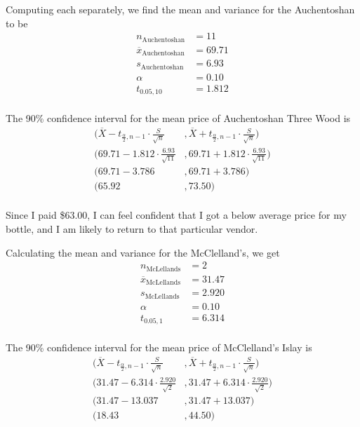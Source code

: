 Computing each separately, we find the mean and variance for the Auchentoshan to be
\begin{equation*}
\begin{split}
    n_{\text{Auchentoshan}} &= 11\\
    \overline{x}_{\text{Auchentoshan}} &= 69.71\\
    s_{\text{Auchentoshan}} &= 6.93\\
    \alpha &= 0.10\\
    t_{0.05, 10} &= 1.812\\
\end{split}
\end{equation*}

The 90\% confidence interval for the mean price of Auchentoshan Three Wood is 
\begin{equation*}
\begin{split}
    \bigg( \overline{X} - t_{\frac{\alpha}{2}, n - 1} \cdot \frac{S}{\sqrt{n}}
    &, 
    \overline{X} + t_{\frac{\alpha}{2}, n - 1} \cdot \frac{S}{\sqrt{n}} \bigg)\\
    \bigg( 69.71 - 1.812  \cdot \frac{6.93}{\sqrt{11}}
    &, 
    69.71 + 1.812  \cdot \frac{6.93}{\sqrt{11}} \bigg)\\
    (69.71 - 3.786 &, 69.71 + 3.786)\\
    (65.92 &, 73.50)\\
\end{split}
\end{equation*}

Since I paid \$63.00, I can feel confident that I got a below average price for my bottle, and I am likely to return to that particular vendor.

Calculating the mean and variance for the McClelland's, we get
\begin{equation*}
\begin{split}
    n_{\text{McLellands}} &= 2\\
    \overline{x}_{\text{McLellands}} &= 31.47\\
    s_{\text{McLellands}} &= 2.920 \\
    \alpha &= 0.10\\
    t_{0.05, 1} &= 6.314\\
\end{split}
\end{equation*}

The 90\% confidence interval for the mean price of McClelland's Islay is
\begin{equation*}
\begin{split}
    \bigg( \overline{X} - t_{\frac{\alpha}{2}, n - 1} \cdot \frac{S}{\sqrt{n}}
    &, 
    \overline{X} + t_{\frac{\alpha}{2}, n - 1} \cdot \frac{S}{\sqrt{n}} \bigg)\\
    \bigg( 31.47 - 6.314  \cdot \frac{2.920}{\sqrt{2}}
    &, 
    31.47 + 6.314  \cdot \frac{2.920}{\sqrt{2}} \bigg)\\
    (31.47 - 13.037 &, 31.47 + 13.037)\\
    (18.43 &, 44.50)\\
\end{split}
\end{equation*}

